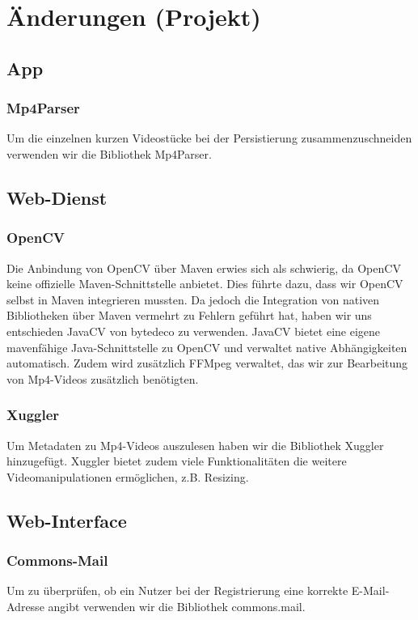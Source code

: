 \chapter{Änderungen (Projekt)} \label{chap:AenderungenProjekt}

\section{App}

\subsection{Mp4Parser}
Um die einzelnen kurzen Videostücke bei der Persistierung zusammenzuschneiden verwenden wir die Bibliothek Mp4Parser.

\section{Web-Dienst}
\subsection{OpenCV}
Die Anbindung von OpenCV über Maven erwies sich als schwierig, da OpenCV keine offizielle Maven-Schnittstelle anbietet. Dies führte dazu, dass wir OpenCV selbst in Maven integrieren mussten. Da jedoch die Integration von nativen Bibliotheken über Maven vermehrt zu Fehlern geführt hat, haben wir uns entschieden JavaCV von bytedeco zu verwenden. JavaCV bietet eine eigene mavenfähige Java-Schnittstelle zu OpenCV und verwaltet native Abhängigkeiten automatisch. Zudem wird zusätzlich FFMpeg verwaltet, das wir zur Bearbeitung von Mp4-Videos zusätzlich benötigten.

\subsection{Xuggler}
Um Metadaten zu Mp4-Videos auszulesen haben wir die Bibliothek Xuggler hinzugefügt. Xuggler bietet zudem viele Funktionalitäten die weitere Videomanipulationen ermöglichen, z.B. Resizing.

\section{Web-Interface}
\subsection{Commons-Mail}
Um zu überprüfen, ob ein Nutzer bei der Registrierung eine korrekte E-Mail-Adresse angibt verwenden wir die Bibliothek commons.mail.


